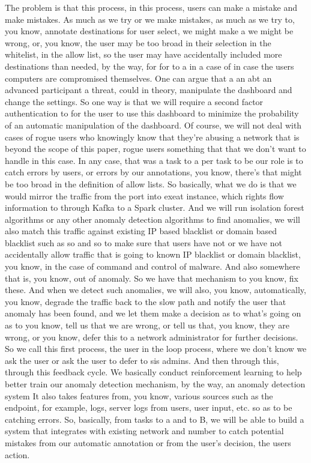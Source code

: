 The problem is that this process, in this process, users can make a mistake and make mistakes. As much as we try or we make mistakes, as much as we try to, you know, annotate destinations for user select, we might make a we might be wrong, or, you know, the user may be too broad in their selection in the whitelist, in the allow list, so the user may have accidentally included more destinations than needed, by the way, for for to a in a case of in case the users computers are compromised themselves. One can argue that a an abt an advanced participant a threat, could in theory, manipulate the dashboard and change the settings. So one way is that we will require a second factor authentication to for the user to use this dashboard to minimize the probability of an automatic manipulation of the dashboard. Of course, we will not deal with cases of rogue users who knowingly know that they're abusing a network that is beyond the scope of this paper, rogue users something that that we don't want to handle in this case. In any case, that was a task to a per task to be our role is to catch errors by users, or errors by our annotations, you know, there's that might be too broad in the definition of allow lists. So basically, what we do is that we would mirror the traffic from the port into exeat instance, which rights flow information to through Kafka to a Spark cluster. And we will run isolation forest algorithms or any other anomaly detection algorithms to find anomalies, we will also match this traffic against existing IP based blacklist or domain based blacklist such as so and so to make sure that users have not or we have not accidentally allow traffic that is going to known IP blacklist or domain blacklist, you know, in the case of command and control of malware. And also somewhere that is, you know, out of anomaly. So we have that mechanism to you know, fix these. And when we detect such anomalies, we will also, you know, automatically, you know, degrade the traffic back to the slow path and notify the user that anomaly has been found, and we let them make a decision as to what's going on as to you know, tell us that we are wrong, or tell us that, you know, they are wrong, or you know, defer this to a network administrator for further decisions. So we call this first process, the user in the loop process, where we don't know we ask the user or ask the user to defer to sis admins. And then through this, through this feedback cycle. We basically conduct reinforcement learning to help better train our anomaly detection mechanism, by the way, an anomaly detection system It also takes features from, you know, various sources such as the endpoint, for example, logs, server logs from users, user input, etc. so as to be catching errors. So, basically, from tasks to a and to B, we will be able to build a system that integrates with existing network and number to catch potential mistakes from our automatic annotation or from the user's decision, the users action.








